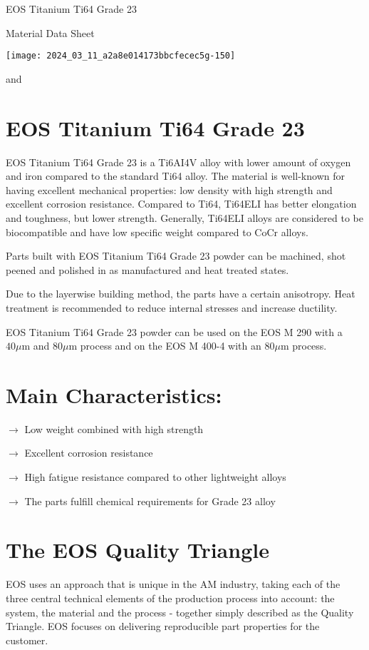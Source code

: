 \documentclass[10pt]{article}
\begin{document}
EOS Titanium Ti64 Grade 23

Material Data Sheet

\begin{center}
\texttt{[image: 2024\_03\_11\_a2a8e014173bbcfecec5g-150]}
\end{center}

and

\section*{EOS Titanium Ti64 Grade 23}
EOS Titanium Ti64 Grade 23 is a Ti6AI4V alloy with lower amount of oxygen and iron compared to the standard Ti64 alloy. The material is well-known for having excellent mechanical properties: low density with high strength and excellent corrosion resistance. Compared to Ti64, Ti64ELI has better elongation and toughness, but lower strength. Generally, Ti64ELI alloys are considered to be biocompatible and have low specific weight compared to $\mathrm{CoCr}$ alloys.

Parts built with EOS Titanium Ti64 Grade 23 powder can be machined, shot peened and polished in as manufactured and heat treated states.

Due to the layerwise building method, the parts have a certain anisotropy. Heat treatment is recommended to reduce internal stresses and increase ductility.

EOS Titanium Ti64 Grade 23 powder can be used on the EOS M 290 with a $40 \mu \mathrm{m}$ and $80 \mu \mathrm{m}$ process and on the EOS M 400-4 with an $80 \mu \mathrm{m}$ process.

\section*{Main Characteristics:}
$\longrightarrow$ Low weight combined with high strength

$\longrightarrow$ Excellent corrosion resistance

$\longrightarrow$ High fatigue resistance compared to other lightweight alloys

$\longrightarrow$ The parts fulfill chemical requirements for Grade 23 alloy

\section*{The EOS Quality Triangle}
EOS uses an approach that is unique in the AM industry, taking each of the three central technical elements of the production process into account: the system, the material and the process - together simply described as the Quality Triangle. EOS focuses on delivering reproducible part properties for the customer.
\end{document}
